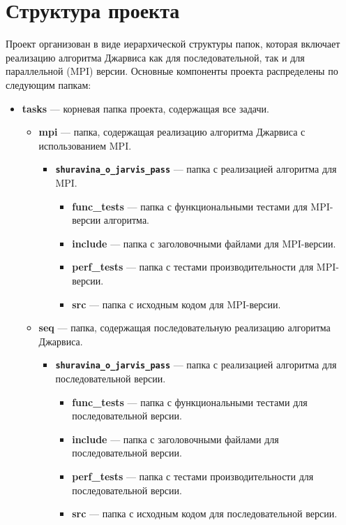 \documentclass[12pt]{article}
\begin{document}
\section*{Структура проекта}

Проект организован в виде иерархической структуры папок, которая включает реализацию алгоритма Джарвиса как для последовательной, так и для параллельной (MPI) версии. Основные компоненты проекта распределены по следующим папкам:

\begin{itemize}
\item \textbf{tasks} — корневая папка проекта, содержащая все задачи.
\begin{itemize}
\item \textbf{mpi} — папка, содержащая реализацию алгоритма Джарвиса с использованием MPI.
\begin{itemize}
\item \textbf{\texttt{shuravina\_o\_jarvis\_pass}} — папка с реализацией алгоритма для MPI.
\begin{itemize}
\item \textbf{func\_tests} — папка с функциональными тестами для MPI-версии алгоритма.
\item \textbf{include} — папка с заголовочными файлами для MPI-версии.
\item \textbf{perf\_tests} — папка с тестами производительности для MPI-версии.
\item \textbf{src} — папка с исходным кодом для MPI-версии.
\end{itemize}
\end{itemize}
\item \textbf{seq} — папка, содержащая последовательную реализацию алгоритма Джарвиса.
\begin{itemize}
\item \textbf{\texttt{shuravina\_o\_jarvis\_pass}} — папка с реализацией алгоритма для последовательной версии.
\begin{itemize}
\item \textbf{func\_tests} — папка с функциональными тестами для последовательной версии.
\item \textbf{include} — папка с заголовочными файлами для последовательной версии.
\item \textbf{perf\_tests} — папка с тестами производительности для последовательной версии.
\item \textbf{src} — папка с исходным кодом для последовательной версии.
\end{itemize}
\end{itemize}
\end{itemize}
\end{itemize}
\end{document}
